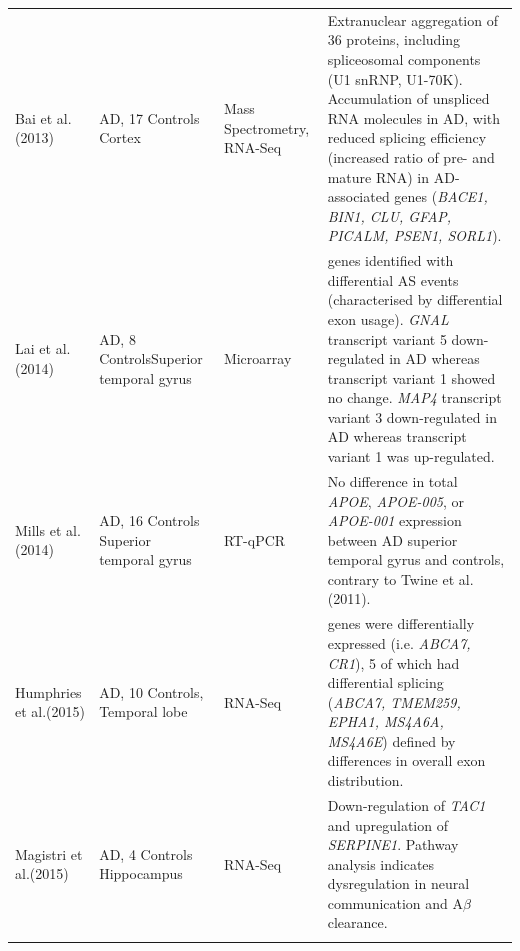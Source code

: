 \begin{landscape}
\begin{longtable}[c]{p{3cm}p{4cm}p{3cm}p{16cm}}
		\centering Bai et al. \newline(2013)\cite{Bai2013} &
		\centering 18 AD, 17 Controls \newline Cortex &
		\centering Mass Spectrometry, RNA-Seq &
		\tabitem Extranuclear aggregation of 36 proteins, including spliceosomal components (U1 snRNP, U1-70K). \newline
		\tabitem Accumulation of unspliced RNA molecules in AD, with reduced splicing efficiency (increased ratio of pre- and mature RNA) in AD-associated genes (\textit{BACE1, BIN1, CLU, GFAP, PICALM, PSEN1, SORL1}).  \\
		\hdashline[0.5pt/5pt]
		
		\centering  Lai et al. \newline(2014)\cite{Lai2014} &
		\centering 8 AD, 8 Controls\newline Superior temporal gyrus &
		\centering Microarray &
		\tabitem 22 genes identified with differential AS events (characterised by differential exon usage). \newline  
		\tabitem \textit{GNAL} transcript variant 5 down-regulated in AD whereas transcript variant 1 showed no change. \newline 
		\tabitem \textit{MAP4} transcript variant 3 down-regulated in AD whereas transcript variant 1 was up-regulated.\\
		\hdashline[0.5pt/5pt]
		
		\centering Mills et al. (2014)\cite{Mills2014} &
		\centering 14 AD, 16 Controls \newline Superior temporal gyrus &
		\centering RT-qPCR &
		\tabitem No difference in total \textit{APOE}, \textit{APOE-005}, or \textit{APOE-001} expression between AD superior temporal gyrus and controls, contrary to Twine et al. (2011)\cite{Twine2011}. \\
		
		\centering Humphries et al.(2015)\cite{Humphries2015} &
		\centering 10 AD, 10 Controls, \newline Temporal lobe &
		\centering RNA-Seq &
		\tabitem 9 genes were differentially expressed (i.e. \textit{ABCA7, CR1}), 5 of which had differential splicing (\textit{ABCA7, TMEM259, EPHA1, MS4A6A, MS4A6E}) defined by differences in overall exon distribution. \\
		
		\centering Magistri et al.(2015)\cite{Magistri2015} &
		\centering 4 AD, 4 Controls \newline Hippocampus &
		\centering RNA-Seq &
		\tabitem Down-regulation of \textit{TAC1} and upregulation of \textit{SERPINE1}. \newline 
		\tabitem Pathway analysis indicates dysregulation in neural communication and A$\beta$ clearance. \\		
		\hdashline[0.5pt/5pt]
		

\end{longtable}
\end{landscape}
